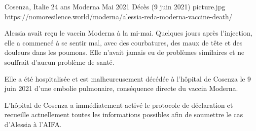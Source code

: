 {Cosenza, Italie}
{24 ans}
{Moderna}
{Mai 2021}
{Décès (9 juin 2021)}
{picture.jpg}
{https://nomoresilence.world/moderna/alessia-reda-moderna-vaccine-death/}
{

Alessia avait reçu le vaccin Moderna à la mi-mai. Quelques jours après
l'injection, elle a commencé à se sentir mal, avec des courbatures, des maux de
tête et des douleurs dans les poumons. Elle n'avait jamais eu de problèmes
similaires et ne souffrait d'aucun problème de santé.

Elle a été hospitalisée et est malheureusement décédée à l'hôpital de Cosenza le
9 juin 2021 d'une embolie pulmonaire, conséquence directe du vaccin Moderna.

L'hôpital de Cosenza a immédiatement activé le protocole de déclaration et
recueille actuellement toutes les informations possibles afin de soumettre le
cas d'Alessia à l'AIFA.

}
